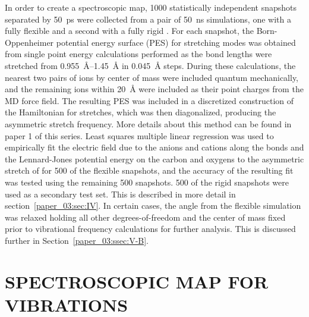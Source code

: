 \documentclass[%
  class = book,%
  crop = false,%
  float = true,%
  multi = true,%
  preview = false,%
]{standalone}
\newcommand{\caps}[1]{\uppercase{#1}}
\begin{document}
In order to create a spectroscopic map, \num{1000} statistically independent snapshots separated by \SI{50}{\pico\second} were collected from a pair of \SI{50}{\nano\second} simulations, one with a fully flexible  and a second with a fully rigid . For each snapshot, the Born-Oppenheimer potential energy surface (PES) for  stretching modes was obtained from single point energy calculations performed as the  bond lengths were stretched from \SIrange{0.955}{1.45}{\angstrom} in \SI{0.045}{\angstrom} steps. During these calculations, the nearest two pairs of ions by center of mass were included quantum mechanically, and the remaining ions within \SI{20}{\angstrom} were included as their point charges from the MD force field. The resulting PES was included in a discretized construction of the Hamiltonian for  stretches, which was then diagonalized, producing the asymmetric stretch frequency. More details about this method can be found in paper 1 of this series. Least squares multiple linear regression was used to empirically fit the electric field due to the anions and cations along the  bonds and the Lennard-Jones potential energy on the  carbon and oxygens to the asymmetric stretch of  for \num{500} of the flexible snapshots, and the accuracy of the resulting fit was tested using the remaining \num{500} snapshots. \num{500} of the rigid snapshots were used as a secondary test set. This is described in more detail in section~\ref{paper_03:sec:IV}. In certain cases, the  angle from the flexible simulation was relaxed holding all other degrees-of-freedom and the  center of mass fixed prior to vibrational frequency calculations for further analysis. This is discussed further in Section~\ref{paper_03:ssec:V-B}.

\section{\texorpdfstring{\caps{Spectroscopic Map for  Vibrations}}{Spectroscopic Map for CO2 Vibrations}}
\label{paper_03:sec:III}
\end{document}
